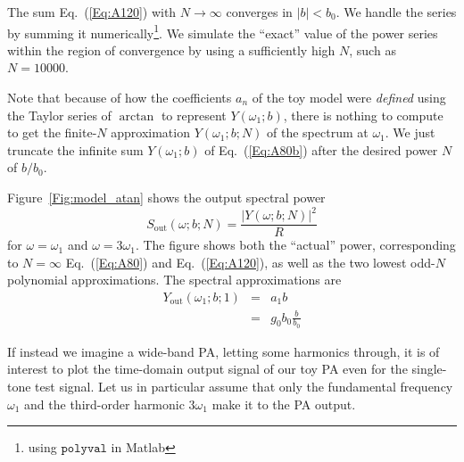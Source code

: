 \documentclass[11pt,oneside,a4paper]{scrartcl}
\newcommand{\Eq}[1]{Eq.~(\ref{Eq:#1})}
\newcommand{\Figure}[1]{Figure~\ref{Fig:#1}}
\newcommand{\abs}[1]{\ensuremath{|#1|}}
\newcommand{\Abs}[1]{\ensuremath{\left|#1\right|}}
\newcommand { \mr }[1] {\ensuremath {\mathrm{#1}}}
\begin{document}
The sum \Eq{A120} with $N \rightarrow \infty$ converges in $\Abs{b} < b_0$. We handle the series by summing it numerically\footnote{using $\mathtt{polyval}$ in Matlab}. We simulate the ``exact'' value of the power series within the region of convergence by using a sufficiently high $N$, such as $N=10000$.

Note that because of how the coefficients $a_n$ of the toy model were \emph{defined} using the Taylor series of $\arctan$ to represent $Y(\omega_1;b)$, there is nothing to compute to get the finite-$N$ approximation
$Y(\omega_1;b;N)$ of the spectrum at $\omega_1$. We just truncate the infinite sum $Y(\omega_1;b)$ of \Eq{A80b} after the desired power $N$ of $b/b_0$.

\Figure{model_atan} shows the output spectral power 
\[
	S_\mr{out}(\omega;b;N) = \frac {\abs{Y(\omega;b;N)}^2}{R}
\]
for $\omega = \omega_1$ and $\omega=3\omega_1$. The figure shows both the ``actual'' power, corresponding to $N = \infty$ \Eq{A80} and \Eq{A120}, as well as the two lowest odd-$N$ polynomial approximations. The spectral approximations are
\begin{eqnarray}
	Y_\mr{out}(\omega_1;b;1) 
		&=& a_1 b \\
		&=& g_0 b_0 \frac{b}{b_0}
\end{eqnarray}


%
%

If instead we imagine a wide-band PA, letting some harmonics through, it is of interest to plot the time-domain output signal of our toy PA even for the single-tone test signal. Let us in particular assume that only the fundamental frequency $\omega_1$ and the third-order harmonic $3\omega_1$ make it to the PA output. 
\end{document}
